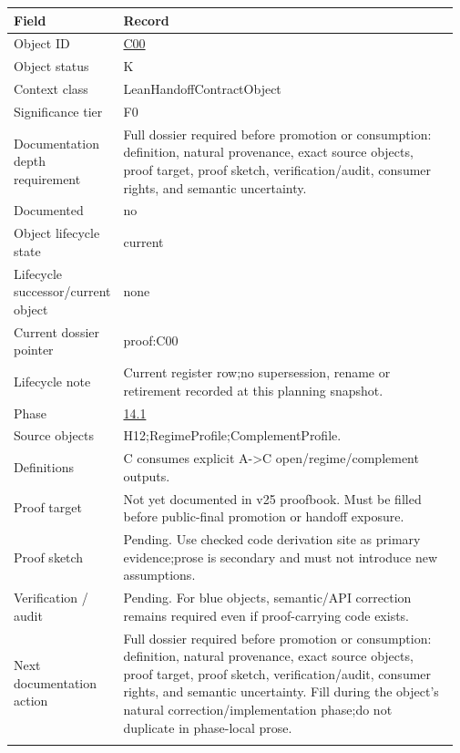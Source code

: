 \begin{longtable}{L{0.16\linewidth} L{0.81\linewidth}}
\hline
\textbf{Field} & \textbf{Record}\\
\hline
Object ID & \hyperlink{object-row-C00}{C00}\\
\hline\addlinespace[0.20em]
Object status & K\\
\hline\addlinespace[0.20em]
Context class & LeanHandoffContractObject\\
\hline\addlinespace[0.20em]
Significance tier & F0\\
\hline\addlinespace[0.20em]
Documentation depth requirement & Full dossier required before promotion or consumption: definition, natural provenance, exact source objects, proof target, proof sketch, verification/\allowbreak{}audit, consumer rights, and semantic uncertainty.\\
\hline\addlinespace[0.20em]
Documented & no\\
\hline\addlinespace[0.20em]
Object lifecycle state & current\\
\hline\addlinespace[0.20em]
Lifecycle successor/\allowbreak{}current object & none\\
\hline\addlinespace[0.20em]
Current dossier pointer & proof:C00\\
\hline\addlinespace[0.20em]
Lifecycle note & Current register row;\newline no supersession, rename or retirement recorded at this planning snapshot.\\
\hline\addlinespace[0.20em]
Phase & \hyperlink{phase-row-14-1}{14.1}\\
\hline\addlinespace[0.20em]
Source objects & H12;\newline RegimeProfile;\newline ComplementProfile.\\
\hline\addlinespace[0.20em]
Definitions & C consumes explicit A->C open/\allowbreak{}regime/\allowbreak{}complement outputs.\\
\hline\addlinespace[0.20em]
Proof target & Not yet documented in v25 proofbook. Must be filled before public-final promotion or handoff exposure.\\
\hline\addlinespace[0.20em]
Proof sketch & Pending. Use checked code derivation site as primary evidence;\newline prose is secondary and must not introduce new assumptions.\\
\hline\addlinespace[0.20em]
Verification /\allowbreak{} audit & Pending. For blue objects, semantic/\allowbreak{}API correction remains required even if proof-carrying code exists.\\
\hline\addlinespace[0.20em]
Next documentation action & Full dossier required before promotion or consumption: definition, natural provenance, exact source objects, proof target, proof sketch, verification/\allowbreak{}audit, consumer rights, and semantic uncertainty. Fill during the object's natural correction/\allowbreak{}implementation phase;\newline do not duplicate in phase-local prose.\\
\hline\addlinespace[0.20em]
\end{longtable}
